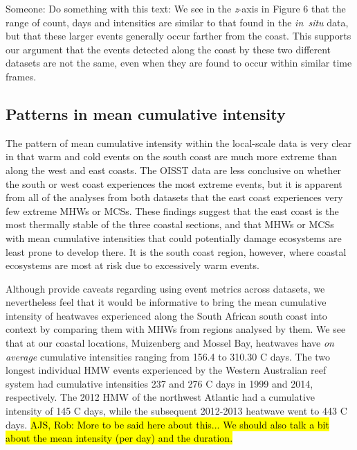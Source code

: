 \documentclass[a4paper,10pt,review]{elsarticle}
\makeatletter
\newcommand{\highlight@DoHighlight}{
  \fill [ decoration = {random steps, amplitude=1pt, segment length=15pt}
        , outer sep = -15pt, inner sep = 0pt, decorate
        , every highlighter, this highlighter ]
        ($(begin highlight)+(0,8pt)$) rectangle ($(end highlight)+(0,-3pt)$) ;
}
\newcommand{\highlight@BeginHighlight}{
  \coordinate (begin highlight) at (0,0) ;
}
\newcommand{\highlight@EndHighlight}{
  \coordinate (end highlight) at (0,0) ;
}
\DeclareRobustCommand*\highlight[1][]{%
  \tikzset{this highlighter/.style={#1}}%
  \SOUL@setup
  \def\SOUL@preamble{%
    \begin{tikzpicture}[overlay, remember picture]
      \highlight@BeginHighlight
      \highlight@EndHighlight
    \end{tikzpicture}%
  }%
  \def\SOUL@postamble{%
    \begin{tikzpicture}[overlay, remember picture]
      \highlight@EndHighlight
      \highlight@DoHighlight
    \end{tikzpicture}%
  }%
  \def\SOUL@everyhyphen{%
    \discretionary{%
      \SOUL@setkern\SOUL@hyphkern
      \SOUL@sethyphenchar
      \tikz[overlay, remember picture] \highlight@EndHighlight ;%
    }{%
    }{%
      \SOUL@setkern\SOUL@charkern
    }%
  }%
  \def\SOUL@everyexhyphen##1{%
    \SOUL@setkern\SOUL@hyphkern
    \hbox{##1}%
    \discretionary{%
      \tikz[overlay, remember picture] \highlight@EndHighlight ;%
    }{%
    }{%
      \SOUL@setkern\SOUL@charkern
    }%
  }%
  \def\SOUL@everysyllable{%
    \begin{tikzpicture}[overlay, remember picture]
      \path let \p0 = (begin highlight), \p1 = (0,0) in \pgfextra
        \global\highlight@previous=\y0
        \global\highlight@current =\y1
      \endpgfextra (0,0) ;
      \ifdim\highlight@current < \highlight@previous
        \highlight@DoHighlight
        \highlight@BeginHighlight
      \fi
    \end{tikzpicture}%
    \the\SOUL@syllable
    \tikz[overlay, remember picture] \highlight@EndHighlight ;%
  }%
  \SOUL@
}
\makeatother
\begin{document}
\highlight[red, draw=blue]{Someone: Do something with this text: We see in the \emph{z}-axis in Figure 6 that the range of count, days and intensities are similar to that found in the \emph{in~situ} data, but that these larger events generally occur farther from the coast. This supports our argument that the events detected along the coast by these two different datasets are not the same, even when they are found to occur within similar time frames.}

\subsection{Patterns in mean cumulative intensity}
The pattern of mean cumulative intensity within the local-scale data is very clear in that warm and cold events on the south coast are much more extreme than along the west and east coasts. The OISST data are less conclusive on whether the south or west coast experiences the most extreme events, but it is apparent from all of the analyses from both datasets that the east coast experiences very few extreme MHWs or MCSs. These findings suggest that the east coast is the most thermally stable of the three coastal sections, and that MHWs or MCSs with mean cumulative intensities that could potentially damage ecosystems are least prone to develop there. It is the south coast region, however, where coastal ecosystems are most at risk due to excessively warm events.

Although \citet{Hobday2016} provide caveats regarding using event metrics across datasets, we nevertheless feel that it would be informative to bring the mean cumulative intensity of heatwaves experienced along the South African south coast into context by comparing them with MHWs from regions analysed by them. We see that at our coastal locations, Muizenberg and Mossel Bay, heatwaves have \emph{on average} cumulative intensities ranging from 156.4 to 310.30 \degree C days. The two longest individual HMW events experienced by the Western Australian reef system \citep{Feng2013} had cumulative intensities 237 and 276 \degree C days in 1999 and 2014, respectively. The 2012 HMW of the northwest Atlantic \citep{Mills2012, Chen2014} had a cumulative intensity of 145 \degree C days, while the subsequent 2012-2013 heatwave went to 443 \degree C days. \hl{AJS, Rob: More to be said here about this... We should also talk a bit about the mean intensity (per day) and the duration.}
\end{document}
